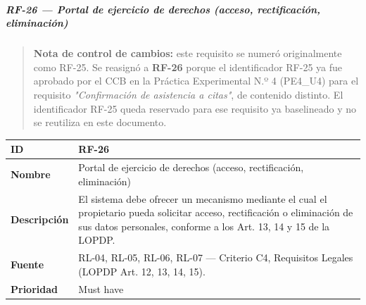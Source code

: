 \documentclass[
]{article}
\newcounter{none} %
\begin{document}
\subparagraph{RF-26 --- Portal de ejercicio de derechos (acceso,
rectificación,
eliminación)}\label{rf-26-portal-de-ejercicio-de-derechos}

\begin{quote}
\textbf{Nota de control de cambios:} este requisito se numeró
originalmente como RF-25. Se reasignó a \textbf{RF-26} porque el
identificador RF-25 ya fue aprobado por el CCB en la Práctica
Experimental N.º 4 (PE4\_U4) para el requisito \emph{"Confirmación de
asistencia a citas"}, de contenido distinto. El identificador RF-25
queda reservado para ese requisito ya baselineado y no se reutiliza en
este documento.
\end{quote}

{\def\LTcaptype{none} %
\begin{longtable}[]{@{}
  >{\raggedright\arraybackslash}p{}
  >{\raggedright\arraybackslash}p{}@{}}
\toprule\noalign{}
\begin{minipage}[b]{\linewidth}\raggedright
\textbf{ID}
\end{minipage} & \begin{minipage}[b]{\linewidth}\raggedright
RF-26
\end{minipage} \\
\midrule\noalign{}
\endhead
\bottomrule\noalign{}
\endlastfoot
\textbf{Nombre} & \begin{minipage}[t]{\linewidth}\raggedright
Portal de ejercicio de derechos (acceso, rectificación, eliminación)
\end{minipage} \\
\textbf{Descripción} & \begin{minipage}[t]{\linewidth}\raggedright
El sistema debe ofrecer un mecanismo mediante el cual el propietario
pueda solicitar acceso, rectificación o eliminación de sus datos
personales, conforme a los Art. 13, 14 y 15 de la LOPDP.
\end{minipage} \\
\textbf{Fuente} & \begin{minipage}[t]{\linewidth}\raggedright
RL-04, RL-05, RL-06, RL-07 --- Criterio C4, Requisitos Legales (LOPDP
Art. 12, 13, 14, 15).
\end{minipage} \\
\textbf{Prioridad} & \begin{minipage}[t]{\linewidth}\raggedright
Must have
\end{minipage} \\

\end{longtable}}
\end{document}
